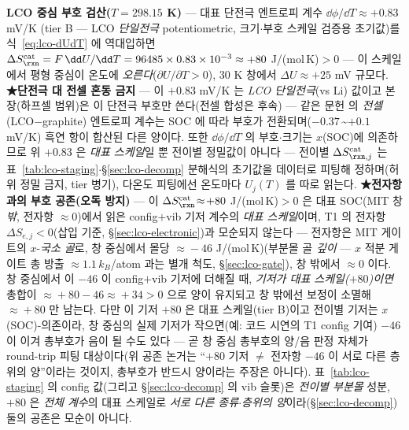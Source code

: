 \begin{verifybox}
\textbf{LCO 중심 부호 검산($T=298.15$ K)} --- 대표 단전극 엔트로피 계수 $\dd\phi/\dd T\approx+0.83$ mV/K\cite{swiderska2019}
(tier B --- LCO \emph{단일전극} potentiometric, 크기$\cdot$부호 스케일 검증용 초기값)를 식~\eqref{eq:lco-dUdT}
에 역대입하면 $\Delta S_{\rxn}^\mathrm{cat}=F\,\dd U/\dd T=96485\times0.83\times10^{-3}\approx+80$ J/(mol\,K)$>0$ ---
이 스케일에서 평형 중심이 온도에 \emph{오른다}($\partial U/\partial T>0$), $30$ K 창에서 $\Delta U\approx+25$ mV 규모다.
\textbf{★단전극 대 전셀 혼동 금지} --- 이 $+0.83$ mV/K 는 \emph{LCO 단일전극}(vs Li) 값이고 본 장(하프셀
범위)은 이 단전극 부호만 쓴다(전셀 합성은 후속) --- 같은 문헌\cite{swiderska2019} 의 \emph{전셀}(LCO$-$graphite) 엔트로피 계수는
SOC 에 따라 부호가 전환되며($-0.37$\,\textasciitilde$+0.1$ mV/K) 흑연 항이 합산된 다른 양이다. 또한
$\dd\phi/\dd T$ 의 부호$\cdot$크기는 $x$(SOC)에 의존하므로 위 $+0.83$ 은 \emph{대표 스케일}일 뿐 전이별
정밀값이 아니다 --- 전이별 $\Delta S_{\rxn,j}^\mathrm{cat}$ 는 표~\ref{tab:lco-staging}$\cdot$\S\ref{sec:lco-decomp}
분해식의 초기값을 데이터로 피팅해 정하며(허위 정밀 금지, tier 병기), 다온도 피팅에선 온도마다 $U_j(T)$ 를 따로 읽는다.
\textbf{★전자항과의 부호 공존(오독 방지)} --- 이 $\Delta S_{\rxn}^\mathrm{cat}\!\approx\!+80$ J/(mol\,K)$>0$ 은
대표 SOC(MIT 창 \emph{밖}, 전자항 $\approx\!0$)에서 읽은 config$+$vib 기저 계수의 \emph{대표 스케일}이며,
T1 의 전자항 $\Delta S_{e,j}<0$(삽입 기준, \S\ref{sec:lco-electronic})과 모순되지 않는다 --- 전자항은 MIT 게이트의
$x$-\emph{국소 골}로, 창 중심에서 몰당 $\approx\!-46$ J/(mol\,K)(부분몰 골 \emph{깊이} --- $x$ 적분 게이트 총 방출 $\approx\!1.1\,k_B$/atom 과는 별개 척도,
\S\ref{sec:lco-gate}), 창 밖에서 $\approx\!0$ 이다. 창 중심에서 이 $-46$ 이 config$+$vib 기저에 더해질 때, \emph{기저가 대표 스케일($+80$)이면} 총합이 $\approx\!+80-46\approx\!+34>0$ 으로
양이 유지되고 창 밖에선 보정이 소멸해 $\approx\!+80$ 만 남는다. 다만 이 기저 $+80$ 은 대표 스케일(tier B)이고
전이별 기저는 $x$(SOC)-의존이라, 창 중심의 실제 기저가 작으면(예: 코드 시연의 T1 config 기여) $-46$ 이 이겨 총부호가
음이 될 수도 있다 --- 곧 창 중심 총부호의 양/음 판정 자체가 round-trip 피팅 대상이다(위 공존 논거는 ``$+80$
기저 $\ne$ 전자항 $-46$ 이 서로 다른 층위의 양''이라는 것이지, 총부호가 반드시 양이라는 주장은 아니다). 표~\ref{tab:lco-staging}
의 config 값(그리고 \S\ref{sec:lco-decomp} 의 vib 슬롯)은 \emph{전이별 부분몰} 성분, $+80$ 은 \emph{전체 계수}의 대표 스케일로 \emph{서로 다른
종류$\cdot$층위의 양}이라(\S\ref{sec:lco-decomp}) 둘의 공존은 모순이 아니다.
\end{verifybox}


